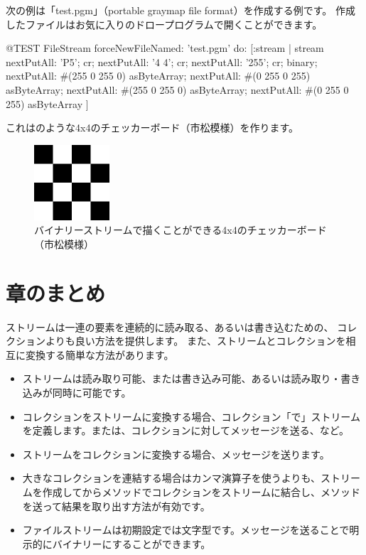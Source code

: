 \documentclass[a4paper,10pt,twoside]{book}
\begin{document}
次の例は「test.pgm」（portable graymap file format）を作成する例です。
作成したファイルはお気に入りのドロープログラムで開くことができます。


\begin{code}{@TEST}
FileStream
  forceNewFileNamed: 'test.pgm' 
  do: [:stream |
	stream
		nextPutAll: 'P5'; cr;
		nextPutAll: '4 4'; cr;
		nextPutAll: '255'; cr;
		binary;
		nextPutAll: #(255 0 255 0) asByteArray;
		nextPutAll: #(0 255 0 255) asByteArray;
		nextPutAll: #(255 0 255 0) asByteArray;
		nextPutAll: #(0 255 0 255) asByteArray
	]
\end{code}

これはのような4x4のチェッカーボード（市松模様）を作ります。

\begin{figure}[!ht]
\centerline{\includegraphics[width=0.25\textwidth]{checkerboard4x4}}
\caption{バイナリーストリームで描くことができる4x4のチェッカーボード（市松模様）}
\vspace{.2in}
\end{figure}

\section{章のまとめ}

ストリームは一連の要素を連続的に読み取る、あるいは書き込むための、
コレクションよりも良い方法を提供します。
また、ストリームとコレクションを相互に変換する簡単な方法があります。
\begin{itemize}
  \item ストリームは読み取り可能、または書き込み可能、あるいは読み取り・書き込みが同時に可能です。
  \item コレクションをストリームに変換する場合、コレクション「で」ストリームを定義します。\eg {}または、コレクションに対してメッセージを送る、など。
  \item ストリームをコレクションに変換する場合、メッセージを送ります。
  \item 大きなコレクションを連結する場合はカンマ演算子を使うよりも、ストリームを作成してからメソッドでコレクションをストリームに結合し、メソッドを送って結果を取り出す方法が有効です。
  \item ファイルストリームは初期設定では文字型です。メッセージを送ることで明示的にバイナリーにすることができます。
\end{itemize}

\ifx\wholebook\relax\else
\end{document}
